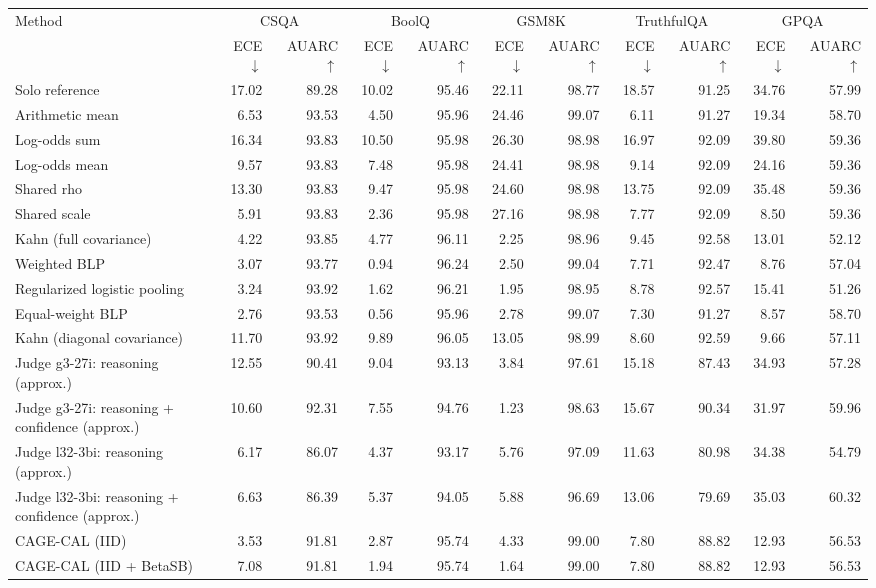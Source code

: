 \begin{tabular}{lrrrrrrrrrr}
\toprule
Method & \multicolumn{2}{c}{CSQA} & \multicolumn{2}{c}{BoolQ} & \multicolumn{2}{c}{GSM8K} & \multicolumn{2}{c}{TruthfulQA} & \multicolumn{2}{c}{GPQA} \\
 & ECE $\downarrow$ & AUARC $\uparrow$ & ECE $\downarrow$ & AUARC $\uparrow$ & ECE $\downarrow$ & AUARC $\uparrow$ & ECE $\downarrow$ & AUARC $\uparrow$ & ECE $\downarrow$ & AUARC $\uparrow$ \\
\midrule
Solo reference & 17.02 & 89.28 & 10.02 & 95.46 & 22.11 & 98.77 & 18.57 & 91.25 & 34.76 & 57.99 \\
Arithmetic mean & 6.53 & 93.53 & 4.50 & 95.96 & 24.46 & 99.07 & 6.11 & 91.27 & 19.34 & 58.70 \\
Log-odds sum & 16.34 & 93.83 & 10.50 & 95.98 & 26.30 & 98.98 & 16.97 & 92.09 & 39.80 & 59.36 \\
Log-odds mean & 9.57 & 93.83 & 7.48 & 95.98 & 24.41 & 98.98 & 9.14 & 92.09 & 24.16 & 59.36 \\
Shared rho & 13.30 & 93.83 & 9.47 & 95.98 & 24.60 & 98.98 & 13.75 & 92.09 & 35.48 & 59.36 \\
Shared scale & 5.91 & 93.83 & 2.36 & 95.98 & 27.16 & 98.98 & 7.77 & 92.09 & 8.50 & 59.36 \\
Kahn (full covariance) & 4.22 & 93.85 & 4.77 & 96.11 & 2.25 & 98.96 & 9.45 & 92.58 & 13.01 & 52.12 \\
Weighted BLP & 3.07 & 93.77 & 0.94 & 96.24 & 2.50 & 99.04 & 7.71 & 92.47 & 8.76 & 57.04 \\
Regularized logistic pooling & 3.24 & 93.92 & 1.62 & 96.21 & 1.95 & 98.95 & 8.78 & 92.57 & 15.41 & 51.26 \\
Equal-weight BLP & 2.76 & 93.53 & 0.56 & 95.96 & 2.78 & 99.07 & 7.30 & 91.27 & 8.57 & 58.70 \\
Kahn (diagonal covariance) & 11.70 & 93.92 & 9.89 & 96.05 & 13.05 & 98.99 & 8.60 & 92.59 & 9.66 & 57.11 \\
Judge g3-27i: reasoning (approx.) & 12.55 & 90.41 & 9.04 & 93.13 & 3.84 & 97.61 & 15.18 & 87.43 & 34.93 & 57.28 \\
Judge g3-27i: reasoning + confidence (approx.) & 10.60 & 92.31 & 7.55 & 94.76 & 1.23 & 98.63 & 15.67 & 90.34 & 31.97 & 59.96 \\
Judge l32-3bi: reasoning (approx.) & 6.17 & 86.07 & 4.37 & 93.17 & 5.76 & 97.09 & 11.63 & 80.98 & 34.38 & 54.79 \\
Judge l32-3bi: reasoning + confidence (approx.) & 6.63 & 86.39 & 5.37 & 94.05 & 5.88 & 96.69 & 13.06 & 79.69 & 35.03 & 60.32 \\
CAGE-CAL (IID) & 3.53 & 91.81 & 2.87 & 95.74 & 4.33 & 99.00 & 7.80 & 88.82 & 12.93 & 56.53 \\
CAGE-CAL (IID + BetaSB) & 7.08 & 91.81 & 1.94 & 95.74 & 1.64 & 99.00 & 7.80 & 88.82 & 12.93 & 56.53 \\
\bottomrule
\end{tabular}
